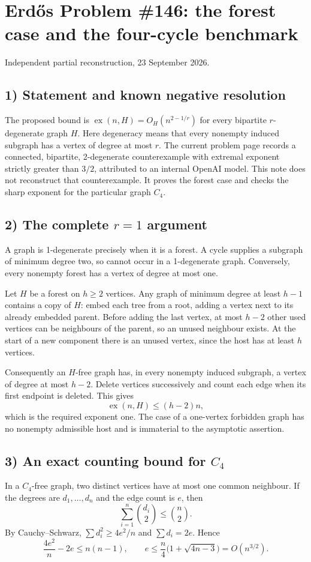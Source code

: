 \section{Erd\H{o}s Problem \#146: the forest case and the four-cycle benchmark}
\noindent Independent partial reconstruction, 23 September 2026.

\subsection*{1) Statement and known negative resolution}
The proposed bound is $\operatorname{ex}(n,H)=O_H(n^{2-1/r})$ for every bipartite $r$-degenerate graph $H$. Here degeneracy means that every nonempty induced subgraph has a vertex of degree at most $r$. The current problem page records a connected, bipartite, 2-degenerate counterexample with extremal exponent strictly greater than $3/2$, attributed to an internal OpenAI model. This note does not reconstruct that counterexample. It proves the forest case and checks the sharp exponent for the particular graph $C_4$.

\subsection*{2) The complete $r=1$ argument}
A graph is 1-degenerate precisely when it is a forest. A cycle supplies a subgraph of minimum degree two, so cannot occur in a 1-degenerate graph. Conversely, every nonempty forest has a vertex of degree at most one.

Let $H$ be a forest on $h\ge2$ vertices. Any graph of minimum degree at least $h-1$ contains a copy of $H$: embed each tree from a root, adding a vertex next to its already embedded parent. Before adding the last vertex, at most $h-2$ other used vertices can be neighbours of the parent, so an unused neighbour exists. At the start of a new component there is an unused vertex, since the host has at least $h$ vertices.

Consequently an $H$-free graph has, in every nonempty induced subgraph, a vertex of degree at most $h-2$. Delete vertices successively and count each edge when its first endpoint is deleted. This gives
\[
 \operatorname{ex}(n,H)\le(h-2)n,
\]
which is the required exponent one. The case of a one-vertex forbidden graph has no nonempty admissible host and is immaterial to the asymptotic assertion.

\subsection*{3) An exact counting bound for $C_4$}
In a $C_4$-free graph, two distinct vertices have at most one common neighbour. If the degrees are $d_1,\ldots,d_n$ and the edge count is $e$, then
\[
 \sum_{i=1}^n\binom{d_i}{2}\le\binom n2.
\]
By Cauchy--Schwarz, $\sum d_i^2\ge4e^2/n$ and $\sum d_i=2e$. Hence
\[
 \frac{4e^2}{n}-2e\le n(n-1),\qquad
 e\le\frac n4\bigl(1+\sqrt{4n-3}\bigr)=O(n^{3/2}).\tag{1}
\]


